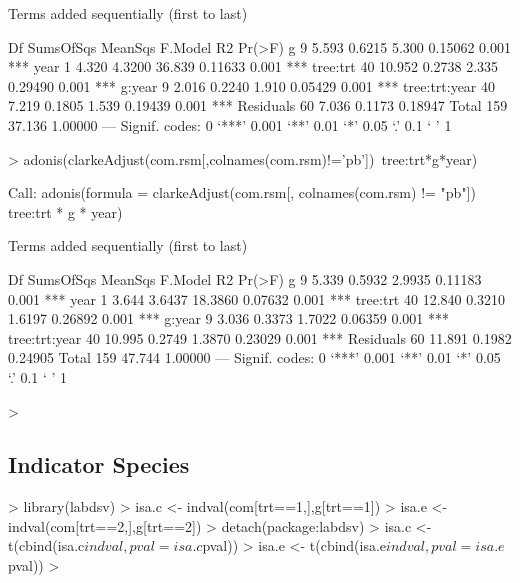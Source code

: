 \documentclass[12pt]{article}
\begin{document}
\begin{Schunk}
\begin{Soutput}
Terms added sequentially (first to last)

               Df SumsOfSqs MeanSqs F.Model      R2 Pr(>F)    
g               9     5.593  0.6215   5.300 0.15062  0.001 ***
year            1     4.320  4.3200  36.839 0.11633  0.001 ***
tree:trt       40    10.952  0.2738   2.335 0.29490  0.001 ***
g:year          9     2.016  0.2240   1.910 0.05429  0.001 ***
tree:trt:year  40     7.219  0.1805   1.539 0.19439  0.001 ***
Residuals      60     7.036  0.1173         0.18947           
Total         159    37.136                 1.00000           
---
Signif. codes:  0 ‘***’ 0.001 ‘**’ 0.01 ‘*’ 0.05 ‘.’ 0.1 ‘ ’ 1 
\end{Soutput}
\begin{Sinput}
> adonis(clarkeAdjust(com.rsm[,colnames(com.rsm)!='pb'])~tree:trt*g*year)
\end{Sinput}
\begin{Soutput}
Call:
adonis(formula = clarkeAdjust(com.rsm[, colnames(com.rsm) !=      "pb"]) ~ tree:trt * g * year) 

Terms added sequentially (first to last)

               Df SumsOfSqs MeanSqs F.Model      R2 Pr(>F)    
g               9     5.339  0.5932  2.9935 0.11183  0.001 ***
year            1     3.644  3.6437 18.3860 0.07632  0.001 ***
tree:trt       40    12.840  0.3210  1.6197 0.26892  0.001 ***
g:year          9     3.036  0.3373  1.7022 0.06359  0.001 ***
tree:trt:year  40    10.995  0.2749  1.3870 0.23029  0.001 ***
Residuals      60    11.891  0.1982         0.24905           
Total         159    47.744                 1.00000           
---
Signif. codes:  0 ‘***’ 0.001 ‘**’ 0.01 ‘*’ 0.05 ‘.’ 0.1 ‘ ’ 1 
\end{Soutput}
\begin{Sinput}
> 
\end{Sinput}
\end{Schunk}

\subsection{Indicator Species}

\begin{Schunk}
\begin{Sinput}
> library(labdsv)
> isa.c <- indval(com[trt==1,],g[trt==1])
> isa.e <- indval(com[trt==2,],g[trt==2])
> detach(package:labdsv)
> isa.c <- t(cbind(isa.c$indval,pval=isa.c$pval))
> isa.e <- t(cbind(isa.e$indval,pval=isa.e$pval))
> 
\end{Sinput}
\end{Schunk}
\end{document}
